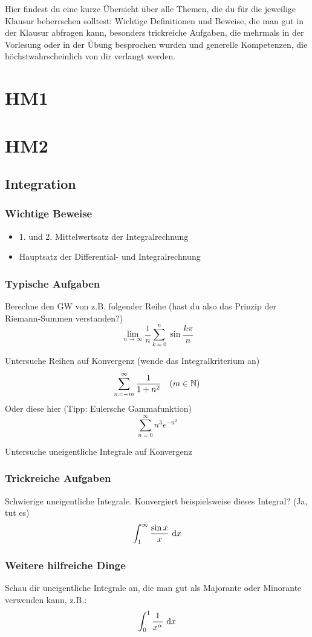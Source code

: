 Hier findest du eine kurze Übersicht über alle Themen, die du für die jeweilige
Klausur beherrschen solltest:
Wichtige Definitionen und Beweise, die man gut in der Klausur abfragen kann,
besonders trickreiche Aufgaben, die mehrmals in der Vorlesung oder in der Übung
besprochen wurden und generelle Kompetenzen, die höchstwahrscheinlich von dir
verlangt werden.
\chapter{HM1}
\chapter{HM2}
\section{Integration}
\subsection{Wichtige Beweise}
\begin{itemize}
  \item 1. und 2. Mittelwertsatz der Integralrechnung
  \item Hauptsatz der Differential- und Integralrechnung
\end{itemize}
\subsection{Typische Aufgaben}
Berechne den GW von z.B. folgender Reihe (hast du also das Prinzip der Riemann-Summen verstanden?)
\begin{equation*}
    \lim\limits_{n \rightarrow \infty}{\frac{1}{n}\sum_{k=0}^n \sin{\frac{k\pi}{n}}}
\end{equation*}

Untersuche Reihen auf Konvergenz (wende das Integralkriterium an)
\begin{equation*}
    \sum_{n=-m}^\infty \frac{1}{1+n^2} \quad (m \in \mathbb{N})
\end{equation*}
Oder diese hier (Tipp: Eulersche Gammafunktion)
\begin{equation}
    \sum_{n=0}^\infty n^3 e^{-n^2}
\end{equation}

Untersuche uneigentliche Integrale auf Konvergenz

\subsection{Trickreiche Aufgaben}
Schwierige uneigentliche Integrale. Konvergiert beispielsweise dieses Integral? (Ja, tut es)
\begin{equation*}
    \int_1^\infty \frac{\sin{x}}{x}\text{ d}x
\end{equation*}

\subsection{Weitere hilfreiche Dinge}
Schau dir uneigentliche Integrale an, die man gut als Majorante oder Minorante
verwenden kann, z.B.:
\begin{equation*}
    \int_0^1 \frac{1}{x^\alpha}\text{ d}x
\end{equation*}
